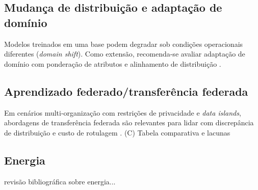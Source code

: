\subsection{Mudança de distribuição e adaptação de domínio}
Modelos treinados em uma base podem degradar sob condições operacionais diferentes (\textit{domain shift}).
Como extensão, recomenda-se avaliar adaptação de domínio com
ponderação de atributos e alinhamento de distribuição
\cite{mahmoodiyan2025_domain_adaptation_thesis}.

\subsection{Aprendizado federado/transferência federada}
Em cenários multi-organização com restrições de privacidade e
\textit{data islands}, abordagens de transferência federada são
relevantes para lidar com discrepância de distribuição e custo de
rotulagem \cite{qian2025_ftl_review}.
(C) Tabela comparativa e lacunas
\subsection{Energia}
revisão bibliográfica sobre energia...